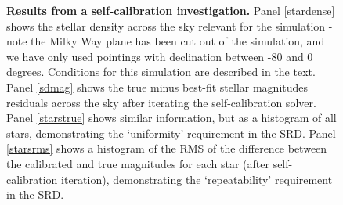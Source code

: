 \documentclass[12pt,preprint]{aastex}
\begin{document}
\begin{figure}
{\begin{minipage}{6.5in}
\caption{{\small
{\bf Results from a self-calibration investigation.} Panel \ref{stardense} shows
the stellar density across the sky relevant for the simulation - note
the Milky Way plane has been cut out of the simulation, and we have
only used pointings with declination between -80 and 0 degrees.
Conditions for this simulation are described in the text.  Panel \ref{sdmag}
shows the true minus best-fit stellar magnitudes residuals across the
sky after iterating the self-calibration solver. Panel \ref{starstrue} shows
similar information, but as a histogram of all stars, demonstrating
the `uniformity'  requirement in the SRD. Panel \ref{starsrms} shows
a histogram of the RMS of the difference between the calibrated and
true magnitudes for each star (after self-calibration iteration),
demonstrating the `repeatability' requirement in the SRD. 
}}
\label{fig:selfcal_fiducial}
\end{minipage}
}
\end{figure}
\end{document}

